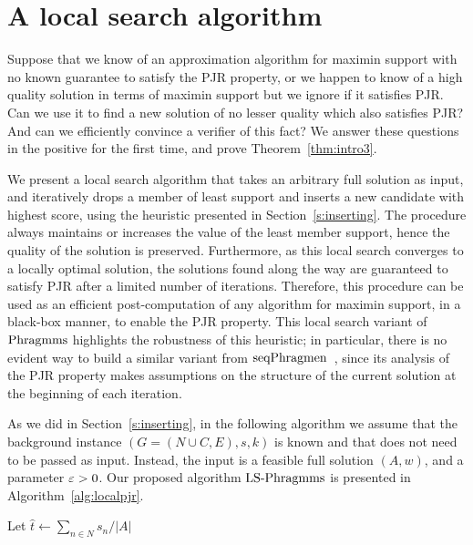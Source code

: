 \section{A local search algorithm}\label{s:LS}

Suppose that we know of an approximation algorithm for maximin support with no known guarantee to satisfy the PJR property, or we happen to know of a high quality solution in terms of maximin support but we ignore if it satisfies PJR. Can we use it to find a new solution of no lesser quality which also satisfies PJR? And can we efficiently convince a verifier of this fact? We answer these questions in the positive for the first time, and prove Theorem~\ref{thm:intro3}.

We present a local search algorithm that takes an arbitrary full solution as input, and iteratively drops a member of least support and inserts a new candidate with highest score, using the heuristic presented in Section~\ref{s:inserting}. 
The procedure always maintains or increases the value of the least member support, hence the quality of the solution is preserved. Furthermore, as this local search converges to a locally optimal solution, the solutions found along the way are guaranteed to satisfy PJR after a limited number of iterations. 
Therefore, this procedure can be used as an efficient post-computation of any algorithm for maximin support, in a black-box manner, to enable the PJR property.
 This local search variant of $\operatorname{Phragmms}$ highlights the robustness of this heuristic; in particular, there is no evident way to build a similar variant from $\operatorname{seqPhragmen}$~\cite{brill2017phragmen}, since its analysis of the PJR property makes assumptions on the structure of the current solution at the beginning of each iteration. 

As we did in Section~\ref{s:inserting}, in the following algorithm we assume that the background instance $(G=(N\cup C, E), s, k)$ is known and that does not need to be passed as input. 
Instead, the input is a feasible full solution $(A,w)$, and a parameter $\varepsilon>0$. 
Our proposed algorithm $\operatorname{LS-Phragmms}$ is presented in Algorithm~\ref{alg:localpjr}. 

\begin{algorithm}[htb]
\SetAlgoLined
{}
Let $\hat{t}\leftarrow \sum_{n\in N} s_n / |A|$ \;
\caption{$\LSPJR(A,w,\eps)$}
\label{alg:localpjr}
\end{algorithm}

